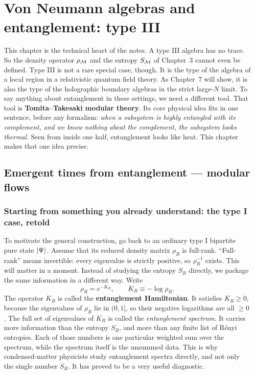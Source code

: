 \chapter{Von Neumann algebras and entanglement: type III}

This chapter is the technical heart of the notes. A type III algebra has no trace. So the density operator
$\rho_{\mathcal{M}}$ and the entropy $S_{\mathcal{M}}$ of Chapter~3 cannot even be defined. Type III is not a rare special case,
though. It is the type of the algebra of a local region in a relativistic quantum field theory. As Chapter~7
will show, it is also the type of the holographic boundary algebras in the strict large-$N$ limit. To say
anything about entanglement in these settings, we need a different tool. That tool is
\textbf{Tomita--Takesaki modular theory}. Its core physical idea fits in one sentence, before any formalism:
\emph{when a subsystem is highly entangled with its complement, and we know nothing about the complement, the
subsystem looks thermal.} Seen from inside one half, entanglement looks like heat. This chapter makes that one
idea precise.

\section{Emergent times from entanglement — modular flows}

\subsection*{Starting from something you already understand: the type I case, retold}

To motivate the general construction, go back to an ordinary type I bipartite pure state $\ket\Psi$. Assume
that its reduced density matrix $\rho_R$ is full-rank. ``Full-rank'' means invertible: every eigenvalue is
strictly positive, so $\rho_R^{-1}$ exists. This will matter in a moment. Instead of studying the entropy $S_R$
directly, we package the same information in a different way. Write
\[
\rho_R = e^{-K_R}, \qquad K_R\equiv-\log\rho_R .
\]
The operator $K_R$ is called the \textbf{entanglement Hamiltonian}. It satisfies $K_R\ge0$, because the
eigenvalues of $\rho_R$ lie in $(0,1]$, so their negative logarithms are all $\ge0$. The full set of
eigenvalues of $K_R$ is called the \emph{entanglement spectrum}. It carries more information than the entropy
$S_R$, and more than any finite list of R\'enyi entropies. Each of those numbers is one particular weighted sum
over the spectrum, while the spectrum itself is the unsummed data. This is why condensed-matter physicists
study entanglement spectra directly, and not only the single number $S_R$. It has proved to be a very useful
diagnostic.

